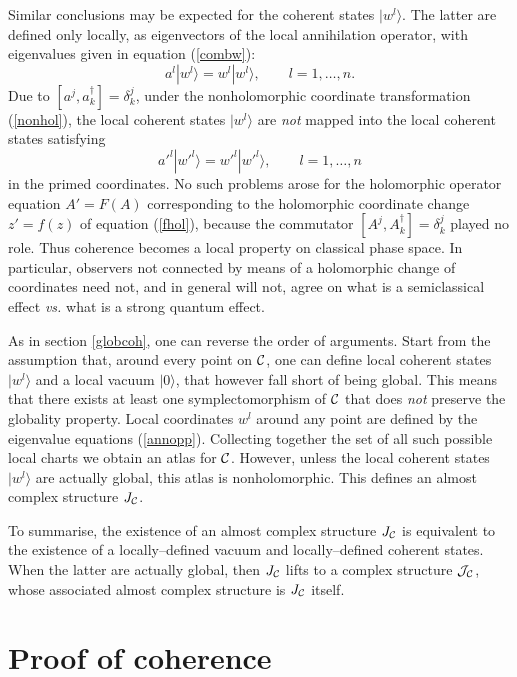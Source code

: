 \documentclass[a4paper,a4paper]{article}
\begin{document}
Similar conclusions may be expected for the coherent states $|w^l\rangle$. 
The latter are defined only locally, as eigenvectors of the local annihilation 
operator, with eigenvalues given in equation (\ref{combw}):
\begin{equation}
a^l|w^l\rangle=w^l|w^l\rangle,\qquad l=1,\ldots, n.
\label{annopp}
\end{equation}
Due to $[a^j,a_k^{\dagger}]=\delta^j_k$, under the nonholomorphic 
coordinate transformation (\ref{nonhol}), the local coherent states 
$|w^l\rangle$ are {\it not} mapped into the local coherent states 
satisfying
\begin{equation}
a'^l|w'^l\rangle=w'^l|w'^l\rangle,\qquad l=1,\ldots, n
\label{annoppp}
\end{equation}
in the primed coordinates. No such problems arose for the holomorphic operator 
equation $A'=F(A)$ corresponding to the holomorphic coordinate change $z'=f(z)$ 
of equation (\ref{fhol}), because the commutator $[A^j, A_k^{\dagger}]=\delta^j_k$ 
played no role. Thus coherence becomes a local property on classical phase space.
In particular,  observers not connected by means of a holomorphic change 
of coordinates need not, and in general will not, agree on what is a semiclassical 
effect {\it vs.} what is a strong quantum effect. 

As in section \ref{globcoh}, one can reverse the order of arguments. 
Start from the assumption that, around every point on ${\cal C}$, one can define local 
coherent states $|w^l\rangle$ and a local vacuum $|0\rangle$, that however fall short
of being global. This means that there exists at least one symplectomorphism of ${\cal C}$
that does {\it not}\/ preserve the globality property. Local coordinates $w^l$ around 
any point are defined by the eigenvalue equations (\ref{annopp}). Collecting together 
the set of all such possible local charts we obtain an atlas for ${\cal C}$. 
However, unless the local coherent states $|w^l\rangle$ are actually global, 
this atlas is nonholomorphic. This defines an almost complex structure $J_{\cal C}$.

To summarise, the existence of an almost complex structure $J_{\cal C}$ 
is equivalent to the existence of a locally--defined vacuum and
locally--defined coherent states. When the latter are actually global, then
$J_{\cal C}$ lifts to a complex structure ${\cal J}_{\cal C}$, whose 
associated almost complex structure is $J_{\cal C}$ itself.

\section{Proof of coherence}\label{prov}
\end{document}
